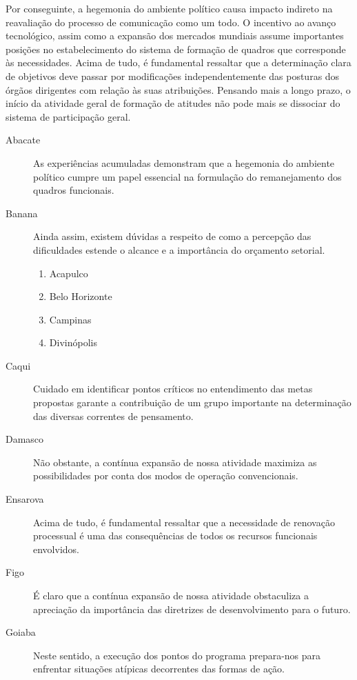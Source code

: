 \documentclass[fleqn]{profmat-cefet}
\begin{document}
Por conseguinte, a hegemonia do ambiente político causa impacto indireto na
reavaliação do processo de comunicação como um todo. O incentivo ao avanço
tecnológico, assim como a expansão dos mercados mundiais assume importantes
posições no estabelecimento do sistema de formação de quadros que corresponde às
necessidades. Acima de tudo, é fundamental ressaltar que a determinação clara de
objetivos deve passar por modificações independentemente das posturas dos órgãos
dirigentes com relação às suas atribuições. Pensando mais a longo prazo, o
início da atividade geral de formação de atitudes não pode mais se dissociar do
sistema de participação geral. 

\begin{description}
    
    \item[Abacate] As experiências acumuladas demonstram que a hegemonia do ambiente político
    cumpre um papel essencial na formulação do remanejamento dos quadros funcionais.
    
    \item[Banana] Ainda assim, existem dúvidas a respeito de como a percepção das
    dificuldades estende o alcance e a importância do orçamento setorial.
    \begin{enumerate}
        \item Acapulco
        \item Belo Horizonte
        \item Campinas
        \item Divinópolis
    \end{enumerate}
        
    \item[Caqui] Cuidado em identificar pontos críticos no entendimento das metas
    propostas garante a contribuição de um grupo importante na determinação das
    diversas correntes de pensamento.
    
    \item[Damasco] Não obstante, a contínua expansão de nossa atividade maximiza as
    possibilidades por conta dos modos de operação convencionais.
    
    \item[Ensarova] Acima de tudo, é fundamental ressaltar que a necessidade de renovação
    processual é uma das consequências de todos os recursos funcionais envolvidos.
    
    \item[Figo] É claro que a contínua expansão de nossa atividade obstaculiza a apreciação
    da importância das diretrizes de desenvolvimento para o futuro.
    
    \item[Goiaba] Neste sentido, a execução dos pontos do programa prepara-nos para enfrentar
    situações atípicas decorrentes das formas de ação. 
    
\end{description}
\end{document}
